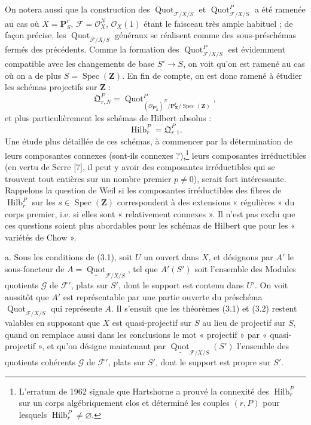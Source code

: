  On notera aussi que la construction des
$\operatorname{Quot}_{\mathcal F/X/S}$ et
$\operatorname{Quot}^P_{\mathcal F/X/S}$ a été ramenée au cas où
$X=\mathbf P^r_S$, $\mathcal F=\mathcal O_X^N$, $\mathcal O_X(1)$ étant le
faisceau très ample habituel ; de façon précise, les
$\operatorname{Quot}_{\mathcal F/X/S}$ généraux se réalisent comme des
sous-préschémas fermés des précédents. Comme la formation des
$\operatorname{Quot}^P_{\mathcal F/X/S}$ est évidemment compatible avec les
changements de base $S'\longrightarrow S$, on voit qu'on est ramené au cas où
on a de plus $S=\operatorname{Spec}(\mathbf Z)$. En fin de compte, on est donc
ramené à étudier les schémas projectifs sur $\mathbf Z$ :
\[
\mathfrak Q^P_{r,N}=
\operatorname{Quot}^{P}_{(\mathcal O_{\mathbf P^r_{\mathbf Z}})^N/
\mathbf P^r_{\mathbf Z}/\operatorname{Spec}(\mathbf Z)},
\]
et plus particulièrement les schémas de Hilbert absolus :
\[
\operatorname{Hilb}^P_r=\mathfrak Q^P_{r,1}.
\]
Une étude plus détaillée de ces schémas, à commencer par la détermination de
leurs composantes connexes (sont-ils connexes ?),\footnote{L'erratum de 1962
signale que Hartshorne a prouvé la connexité des $\operatorname{Hilb}^P_r$ sur
un corps algébriquement clos et déterminé les couples $(r,P)$ pour lesquels
$\operatorname{Hilb}^P_r\neq\varnothing$.} leurs composantes irréductibles (en
vertu de Serre [7], il peut y avoir des composantes irréductibles qui se
trouvent tout entières sur un nombre premier $p\neq0$), serait fort
intéressante. Rappelons la question de Weil si les composantes irréductibles des
fibres de $\operatorname{Hilb}^P_r$ sur les
$s\in\operatorname{Spec}(\mathbf Z)$ correspondent à des extensions
« régulières » du corps premier, i.e. si elles sont « relativement connexes ».
Il n'est pas exclu que ces questions soient plus abordables pour les schémas de
Hilbert que pour les « variétés de Chow ».


\noindent a. Sous les conditions de (3.1), soit $U$ un ouvert dans $X$, et
désignons par $A'$ le sous-foncteur de
$A=\underline{\operatorname{Quot}}_{\mathcal F/X/S}$, tel que $A'(S')$ soit
l'ensemble des Modules quotients $\mathcal G$ de $\mathcal F'$, plats sur
$S'$, dont le support est contenu dans $U'$. On voit aussitôt que $A'$ est
représentable par une partie ouverte du préschéma
$\operatorname{Quot}_{\mathcal F/X/S}$ qui représente $A$. Il s'ensuit que les
théorèmes (3.1) et (3.2)
restent valables en supposant que $X$ est quasi-projectif sur $S$ au lieu de
projectif sur $S$, quand on remplace aussi dans les conclusions le mot
« projectif » par « quasi-projectif », et qu'on désigne maintenant par
$\underline{\operatorname{Quot}}_{\mathcal F/X/S}(S')$ l'ensemble des
quotients cohérents $\mathcal G$ de $\mathcal F'$, plats sur $S'$, dont le
support est propre sur $S'$.

